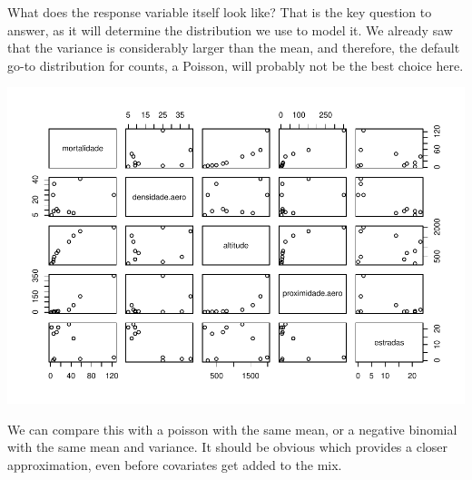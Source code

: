 \documentclass[
]{book}
\newenvironment{Shaded}{\begin{snugshade}}{\end{snugshade}}
\newcommand{\AttributeTok}[1]{\textcolor[rgb]{0.77,0.63,0.00}{#1}}
\newcommand{\DecValTok}[1]{\textcolor[rgb]{0.00,0.00,0.81}{#1}}
\newcommand{\FunctionTok}[1]{\textcolor[rgb]{0.00,0.00,0.00}{#1}}
\newcommand{\NormalTok}[1]{#1}
\newcommand{\SpecialCharTok}[1]{\textcolor[rgb]{0.00,0.00,0.00}{#1}}
\newcommand{\StringTok}[1]{\textcolor[rgb]{0.31,0.60,0.02}{#1}}
\begin{document}
What does the response variable itself look like? That is the key question to answer, as it will determine the distribution we use to model it. We already saw that the variance is considerably larger than the mean, and therefore, the default go-to distribution for counts, a Poisson, will probably not be the best choice here.

\begin{Shaded}
\end{Shaded}

\includegraphics{ECOMODbook_files/figure-latex/unnamed-chunk-23-1.pdf}

We can compare this with a poisson with the same mean, or a negative binomial with the same mean and variance. It should be obvious which provides a closer approximation, even before covariates get added to the mix.
\end{document}
